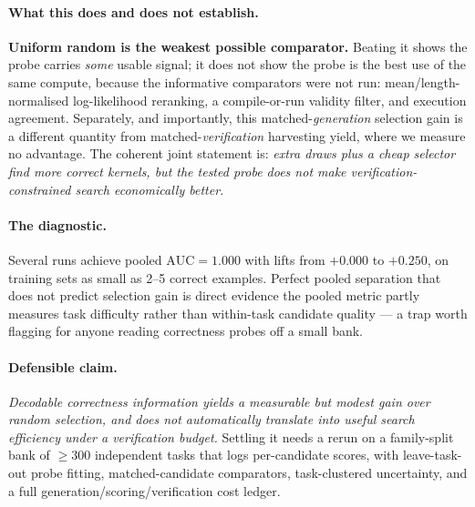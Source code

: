 \paragraph{What this does and does not establish.} \textbf{Uniform random is the weakest possible comparator.}
Beating it shows the probe carries \emph{some} usable signal; it does not show the probe is the best use of the
same compute, because the informative comparators were not run: mean/length-normalised log-likelihood reranking,
a compile-or-run validity filter, and execution agreement. Separately, and importantly, this
matched-\emph{generation} selection gain is a different quantity from matched-\emph{verification} harvesting
yield, where we measure no advantage. The coherent joint statement is: \emph{extra draws plus a cheap selector
find more correct kernels, but the tested probe does not make verification-constrained search economically
better.}

\paragraph{The diagnostic.} Several runs achieve pooled $\mathrm{AUC}{=}1.000$ with lifts from $+0.000$ to
$+0.250$, on training sets as small as 2--5 correct examples. Perfect pooled separation that does not predict
selection gain is direct evidence the pooled metric partly measures task difficulty rather than within-task
candidate quality --- a trap worth flagging for anyone reading correctness probes off a small bank.

\paragraph{Defensible claim.} \emph{Decodable correctness information yields a measurable but modest gain over
random selection, and does not automatically translate into useful search efficiency under a verification
budget.} Settling it needs a rerun on a family-split bank of $\geq$300 independent tasks that logs
per-candidate scores, with leave-task-out probe fitting, matched-candidate comparators, task-clustered
uncertainty, and a full generation/scoring/verification cost ledger.

